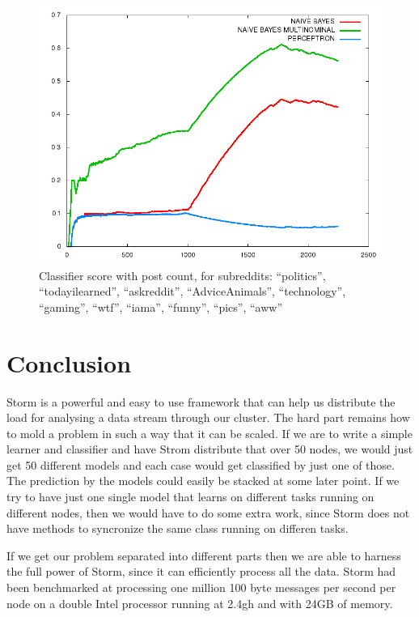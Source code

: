\documentclass[journal]{IEEEtran/IEEEtran}
\begin{document}
\begin{figure}[htbp]
    \begin{center}
        \includegraphics[scale=0.30]{img/plot-1.png}
        \caption{Classifier score with post count, for subreddits: ``politics'', ``todayilearned'', ``askreddit'', ``AdviceAnimals'', ``technology'', ``gaming'', ``wtf'', ``iama'', ``funny'', ``pics'', ``aww''}
        \label{resmulti}
    \end{center}
\end{figure}







\section{Conclusion}

Storm is a powerful and easy to use framework that can help us distribute the load for analysing a data stream through our cluster. The hard part remains how to mold a problem in such a way that it can be scaled. If we are to write a simple learner and classifier and have Strom distribute that over 50 nodes, we would just get 50 different models and each case would get classified by just one of those. The prediction by the models could easily be stacked at some later point. If we try to have just one single model that learns on different tasks running on different nodes, then we would have to do some extra work, since Storm does not have methods to syncronize the same class running on differen tasks. 

If we get our problem separated into different parts then we are able to harness the full power of Storm, since it can efficiently process all the data. Storm had been benchmarked at processing one million 100 byte messages per second per node on a double Intel processor running at 2.4gh and with 24GB of memory. 
\end{document}
